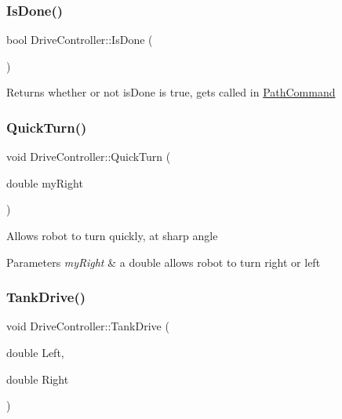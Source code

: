 \subsubsection{\texorpdfstring{Is\+Done()}{IsDone()}}
{\footnotesize\ttfamily bool Drive\+Controller\+::\+Is\+Done (\begin{DoxyParamCaption}{ }\end{DoxyParamCaption})}

\begin{DoxyReturn}{Returns}
whether or not is\+Done is true, gets called in \hyperlink{class_path_command}{Path\+Command} 
\end{DoxyReturn}
\mbox{\label{class_drive_controller_a3e9f778228ea2812b372fbb43fdf5a08}} 
\subsubsection{\texorpdfstring{Quick\+Turn()}{QuickTurn()}}
{\footnotesize\ttfamily void Drive\+Controller\+::\+Quick\+Turn (\begin{DoxyParamCaption}\item[{double}]{my\+Right }\end{DoxyParamCaption})\hspace{0.3cm}{\ttfamily [private]}}

Allows robot to turn quickly, at sharp angle 
\begin{DoxyParams}{Parameters}
{\em my\+Right} & a double allows robot to turn right or left \\
\hline
\end{DoxyParams}
\mbox{\label{class_drive_controller_a93ed2c0196329dcbd6dd666f609ef487}} 
\subsubsection{\texorpdfstring{Tank\+Drive()}{TankDrive()}}
{\footnotesize\ttfamily void Drive\+Controller\+::\+Tank\+Drive (\begin{DoxyParamCaption}\item[{double}]{Left,  }\item[{double}]{Right }\end{DoxyParamCaption})\hspace{0.3cm}{\ttfamily [private]}}

